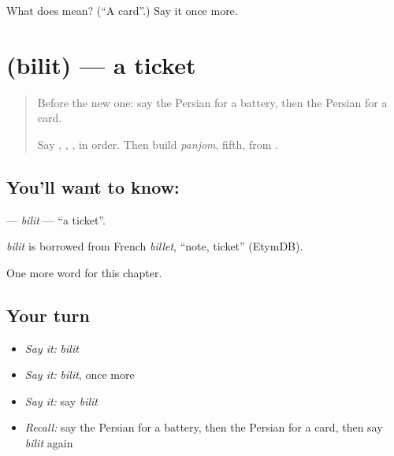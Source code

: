 \begin{tcolorbox}[breakable,colback=teal!4,colframe=teal!35!black,title={Before you move on}]
What does  mean? (\textquotedblleft{}A card\textquotedblright{}.) Say it once more.
\end{tcolorbox}
\section[\texorpdfstring{\fa{بلیت} (bilit)}{بلیت (bilit)}]{ (bilit) — a ticket}

\label{lesson:FA-C113-bilit}



\begin{quote}
Before the new one: say the Persian for a battery, then the Persian for a card.

Say \textbf{}, \textbf{}, \textbf{}, \textbf{} in order. Then build \emph{panjom}, fifth, from \textbf{}.
\end{quote}

\subsection*{You'll want to know: }
\textbf{} — \emph{bilit} — \textquotedblleft{}a ticket\textquotedblright{}.

\begin{cousinweb}
\emph{bilit} is borrowed from French \emph{billet}, \textquotedblleft{}note, ticket\textquotedblright{} (EtymDB).
\end{cousinweb}

\begin{grammarlens}[title={What you've built}]
One more word for this chapter.
\end{grammarlens}

\subsection*{Your turn}
\begin{itemize}
\raggedright
  \item \emph{Say it:} \emph{bilit}
  \item \emph{Say it:} \emph{bilit}, once more
  \item \emph{Say it:} say \emph{bilit}
  \item \emph{Recall:} say the Persian for a battery, then the Persian for a card, then say \emph{bilit} again
\end{itemize}

